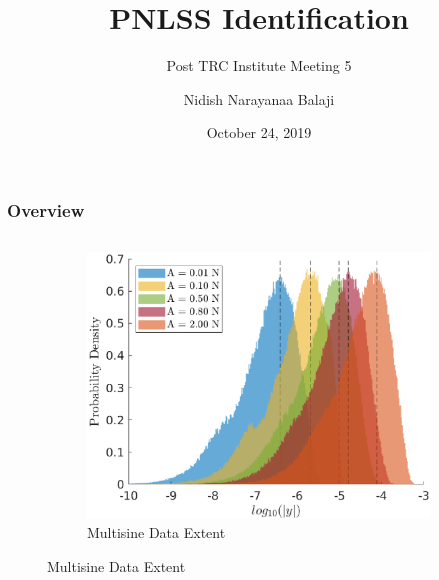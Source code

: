\documentclass[aspectratio=169]{beamer}
\title{PNLSS Identification}
\subtitle{Post TRC Institute Meeting 5}
\author[Balaji, N. N.]{Nidish Narayanaa Balaji}
\institute[Rice U.]{Rice University, Houston, TX 77005}
\date{October 24, 2019}
\begin{document}
\maketitle{}

\begin{frame}
  \frametitle{Overview}
  \begin{columns}
    \begin{column}{0.3\linewidth}
      \vspace{-0.55cm}
      \begin{figure}[!h]
        \centering
        \begin{subfigure}{\linewidth}
          \centering
          \includegraphics[width=\linewidth]{../../benchmark4/FIGURES/MSDAT_LHIST}
          \caption{Multisine Data Extent}
          \label{fig:msdat}
        \end{subfigure}
      

\end{figure}
\end{column}
\end{columns}
\end{frame}
\end{document}
